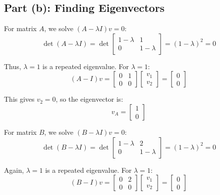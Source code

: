 \subsection*{Part (b): Finding Eigenvectors}

For matrix $A$, we solve $(A - \lambda I)v = 0$:
\begin{equation}
\det(A - \lambda I) = \det \begin{bmatrix} 1-\lambda & 1 \\ 0 & 1-\lambda \end{bmatrix} = (1-\lambda)^2 = 0
\end{equation}

Thus, $\lambda = 1$ is a repeated eigenvalue. For $\lambda = 1$:
\begin{equation}
(A - I)v = \begin{bmatrix} 0 & 1 \\ 0 & 0 \end{bmatrix} \begin{bmatrix} v_1 \\ v_2 \end{bmatrix} = \begin{bmatrix} 0 \\ 0 \end{bmatrix}
\end{equation}

This gives $v_2 = 0$, so the eigenvector is:
\begin{equation}
v_A = \begin{bmatrix} 1 \\ 0 \end{bmatrix}
\end{equation}

For matrix $B$, we solve $(B - \lambda I)v = 0$:
\begin{equation}
\det(B - \lambda I) = \det \begin{bmatrix} 1-\lambda & 2 \\ 0 & 1-\lambda \end{bmatrix} = (1-\lambda)^2 = 0
\end{equation}

Again, $\lambda = 1$ is a repeated eigenvalue. For $\lambda = 1$:
\begin{equation}
(B - I)v = \begin{bmatrix} 0 & 2 \\ 0 & 0 \end{bmatrix} \begin{bmatrix} v_1 \\ v_2 \end{bmatrix} = \begin{bmatrix} 0 \\ 0 \end{bmatrix}
\end{equation}

